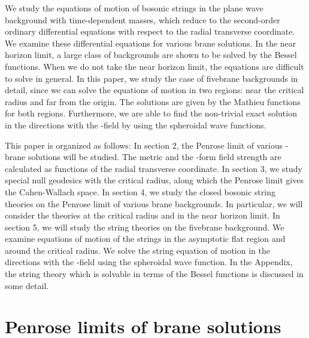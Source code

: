 \documentclass[a4paper,12pt]{article}
\begin{document}
We study the equations of motion of bosonic
strings in the plane wave background
with time-dependent masses, which reduce to the second-order ordinary
differential equations with respect to the radial transverse coordinate. 
We examine these differential equations 
for various brane solutions.
In the near horizon limit, a large class of backgrounds are shown to
be solved by the Bessel functions.
When we do not take the near horizon limit, the equations are difficult
to solve in general. 
In this paper, we study the case of 
\coordHE{} fivebrane backgrounds in detail, since  we can solve 
the equations of motion in two regions: near the critical
radius and far from the origin.
The solutions are given by the Mathieu functions for both regions.
Furthermore, we are able to find the non-trivial exact solution 
in the directions with the \coordHE{}-field by using the spheroidal wave functions.

This paper is organized as follows:
In section 2, the Penrose limit of various \coordHE{}-brane solutions will be
studied.
The metric and  the \coordHE{}-form field strength 
are calculated as functions of the radial 
transverse coordinate.
In section 3, we study special null geodesics 
with the critical radius,
along which the Penrose limit gives the Cahen-Wallach space.
In section 4, we study the closed bosonic string theories on the
Penrose limit of various brane backgrounds.
In particular, we will consider the theories at the critical radius 
and in the near horizon limit.
In section 5, we will study the string theories on the \coordHE{}
fivebrane background. 
We examine equations of motion of the strings 
in the asymptotic flat region and around the critical radius.
We solve the string equation of motion in the directions with the \coordHE{}-field
using the spheroidal wave function.
In the Appendix, the string theory which is solvable in terms of the Bessel 
functions is discussed in some detail.



\section{Penrose limits of brane solutions}   
\end{document}

